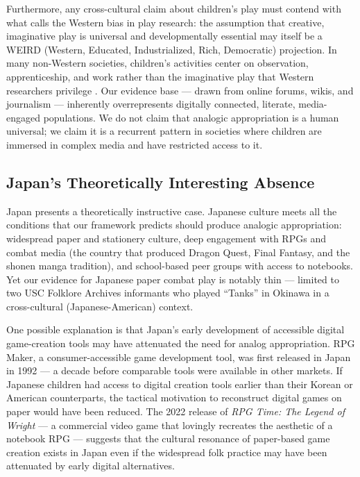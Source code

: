 \documentclass[12pt]{article}
\begin{document}
Furthermore, any cross-cultural claim about children's play must contend with what \citet{lancy2015} calls the Western bias in play research: the assumption that creative, imaginative play is universal and developmentally essential may itself be a WEIRD (Western, Educated, Industrialized, Rich, Democratic) projection. In many non-Western societies, children's activities center on observation, apprenticeship, and work rather than the imaginative play that Western researchers privilege \citep{henrich2010}. Our evidence base --- drawn from online forums, wikis, and journalism --- inherently overrepresents digitally connected, literate, media-engaged populations. We do not claim that analogic appropriation is a human universal; we claim it is a recurrent pattern in societies where children are immersed in complex media and have restricted access to it.

\subsection{Japan's Theoretically Interesting Absence}

Japan presents a theoretically instructive case. Japanese culture meets all the conditions that our framework predicts should produce analogic appropriation: widespread paper and stationery culture, deep engagement with RPGs and combat media (the country that produced Dragon Quest, Final Fantasy, and the shonen manga tradition), and school-based peer groups with access to notebooks. Yet our evidence for Japanese paper combat play is notably thin --- limited to two USC Folklore Archives informants who played ``Tanks'' in Okinawa in a cross-cultural (Japanese-American) context.

One possible explanation is that Japan's early development of accessible digital game-creation tools may have attenuated the need for analog appropriation. RPG Maker, a consumer-accessible game development tool, was first released in Japan in 1992 --- a decade before comparable tools were available in other markets. If Japanese children had access to digital creation tools earlier than their Korean or American counterparts, the tactical motivation to reconstruct digital games on paper would have been reduced. The 2022 release of \emph{RPG Time: The Legend of Wright} --- a commercial video game that lovingly recreates the aesthetic of a notebook RPG --- suggests that the cultural resonance of paper-based game creation exists in Japan even if the widespread folk practice may have been attenuated by early digital alternatives.
\end{document}
